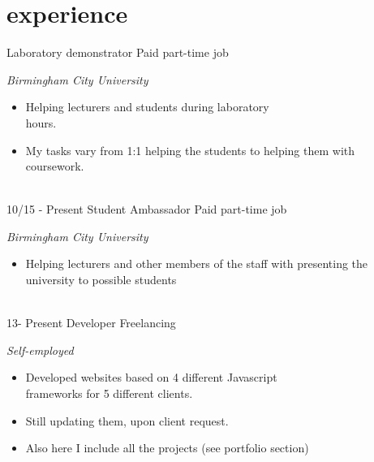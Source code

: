 \documentclass[]{friggeri-cv}
\begin{document}
\section{experience}
\begin{entrylist}

    {Laboratory demonstrator}
    {Paid part-time job}
    {
    \emph{Birmingham City University}
    \begin{itemize}
    \item Helping lecturers and students during laboratory \\hours.
    \item My tasks vary from 1:1 helping the students to helping them with coursework.
    \end{itemize}
    }


   
  
 
  \\
  \entry
  {10/15 - Present}
  {Student Ambassador}
  {Paid part-time job}
  {\emph{Birmingham City University} 
    \begin{itemize}
      \item Helping lecturers and other members of the staff with presenting the \\ university to possible students
    \end{itemize}}\\
    
    \entry
  {13- Present}
  {Developer}
  {Freelancing}
  {\emph {Self-employed} 
    \begin{itemize}
      \item Developed websites based on 4 different Javascript \\ frameworks
      for 5 different clients.
      \item Still updating them, upon client request.
      \item Also here I include all the projects (see portfolio section)
    \end{itemize}}\\
  
\end{entrylist}
\end{document}
